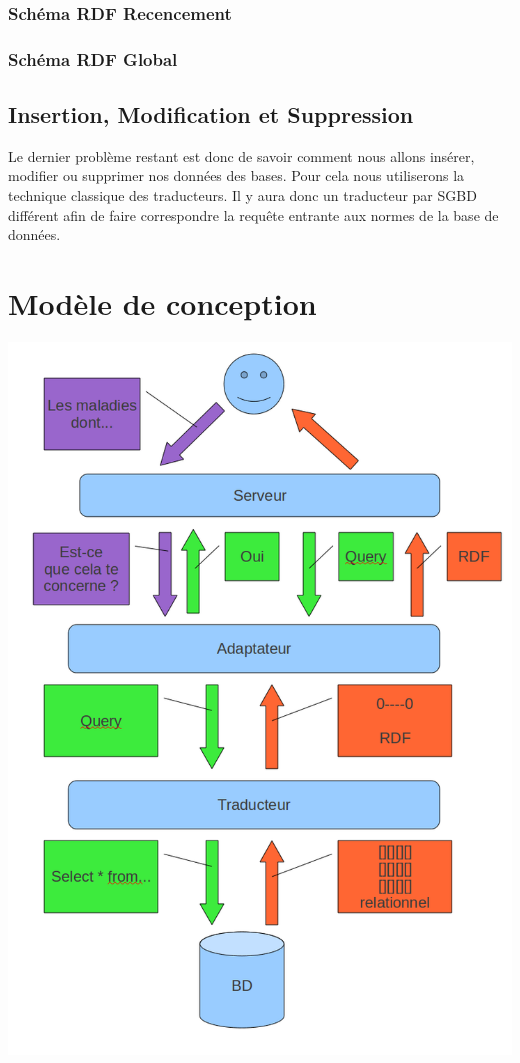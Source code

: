 \documentclass[12pt]{article}
\begin{document}
\subsubsection{Schéma RDF Recencement}

\subsubsection{Schéma RDF Global}

\subsection{Insertion, Modification et Suppression}
	
	Le dernier problème restant est donc de savoir comment nous allons insérer, modifier ou supprimer nos données des bases. Pour cela nous utiliserons la technique classique des traducteurs. Il y aura donc un traducteur par SGBD différent afin de faire correspondre la requête entrante aux normes de la base de données.

\newpage

\section{Modèle de conception}

\begin{center}
	\includegraphics[scale=0.50]{images/selectQuerySysteme.png}
\end{center}
\end{document}
